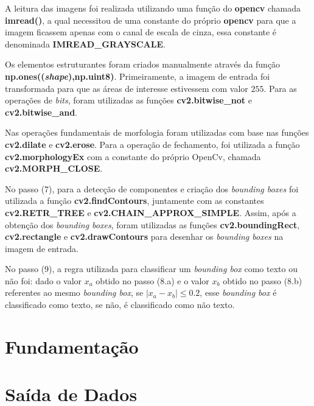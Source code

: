\documentclass[twoside,twocolumn]{article}
\begin{document}
A leitura das imagens foi realizada utilizando uma função do \textbf{opencv} \cite{b1} chamada \textbf{imread()}, a qual necessitou de uma constante do próprio \textbf{opencv} para que a imagem ficassem apenas com o canal de escala de cinza, essa constante é denominada \textbf{IMREAD\_GRAYSCALE}.

Os elementos estruturantes foram criados manualmente através da função \textbf{np.ones((\textit{shape}),np.uint8)}. Primeiramente, a imagem de entrada foi transformada para que as áreas de interesse estivessem com valor $255$. Para as operações de \textit{bits}, foram utilizadas as funções \textbf{cv2.bitwise\_not} e \textbf{cv2.bitwise\_and}.

Nas operações fundamentais de morfologia foram utilizadas com base nas funções \textbf{cv2.dilate} e \textbf{cv2.erose}. Para a operação de fechamento, foi utilizada a função \textbf{cv2.morphologyEx} com a constante do próprio OpenCv, chamada \textbf{cv2.MORPH\_CLOSE}.

No passo (7), para a detecção de componentes e criação dos \textit{bounding boxes} foi utilizada a função \textbf{cv2.findContours}, juntamente com as constantes \textbf{cv2.RETR\_TREE} e \textbf{cv2.CHAIN\_APPROX\_SIMPLE}. Assim, após a obtenção dos \textit{bounding boxes}, foram utilizadas as funções \textbf{cv2.boundingRect}, \textbf{cv2.rectangle} e \textbf{cv2.drawContours} para desenhar os \textit{bounding boxes} na imagem de entrada.

No passo (9), a regra utilizada para classificar um \textit{bounding box} como texto ou não foi: dado o valor $x_{a}$ obtido no passo (8.a) e o valor $x_{b}$ obtido no passo (8.b) referentes ao mesmo \textit{bounding box}, se $|x_{a} - x_{b}| \leq 0.2$, esse \textit{bounding box} é classificado como texto, se não, é classificado como não texto.



\section{Fundamentação}



\section{Saída de Dados}


\end{document}
